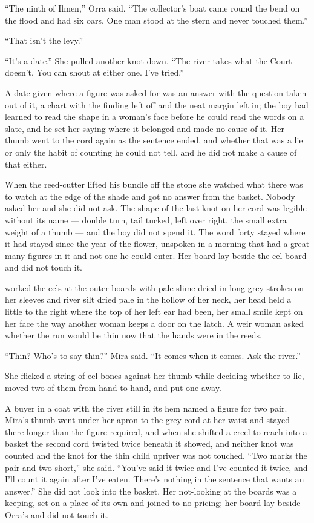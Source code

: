 “The ninth of Ilmen,” Orra said. “The collector's boat came round the bend on the flood and had six oars. One man stood at the stern and never touched them.”

“That isn't the levy.”

“It's a date.” She pulled another knot down. “The river takes what the Court doesn't. You can shout at either one. I've tried.”

A date given where a figure was asked for was an answer with the question taken out of it, a chart with the finding left off and the neat margin left in; the boy had learned to read the shape in a woman's face before he could read the words on a slate, and he set her saying where it belonged and made no cause of it. Her thumb went to the cord again as the sentence ended, and whether that was a lie or only the habit of counting he could not tell, and he did not make a cause of that either.

When the reed-cutter lifted his bundle off the stone she watched what there was to watch at the edge of the shade and got no answer from the basket. Nobody asked her and she did not ask. The shape of the last knot on her cord was legible without its name --- double turn, tail tucked, left over right, the small extra weight of a thumb --- and the boy did not spend it. The word forty stayed where it had stayed since the year of the flower, unspoken in a morning that had a great many figures in it and not one he could enter. Her board lay beside the eel board and did not touch it.

 worked the eels at the outer boards with pale slime dried in long grey strokes on her sleeves and river silt dried pale in the hollow of her neck, her head held a little to the right where the top of her left ear had been, her small smile kept on her face the way another woman keeps a door on the latch. A weir woman asked whether the run would be thin now that the hands were in the reeds.

“Thin? Who's to say thin?” Mira said. “It comes when it comes. Ask the river.”

She flicked a string of eel-bones against her thumb while deciding whether to lie, moved two of them from hand to hand, and put one away.

A buyer in a coat with the river still in its hem named a figure for two pair. Mira's thumb went under her apron to the grey cord at her waist and stayed there longer than the figure required, and when she shifted a creel to reach into a basket the second cord twisted twice beneath it showed, and neither knot was counted and the knot for the thin child upriver was not touched. “Two marks the pair and two short,” she said. “You've said it twice and I've counted it twice, and I'll count it again after I've eaten. There's nothing in the sentence that wants an answer.” She did not look into the basket. Her not-looking at the boards was a keeping, set on a place of its own and joined to no pricing; her board lay beside Orra's and did not touch it.

